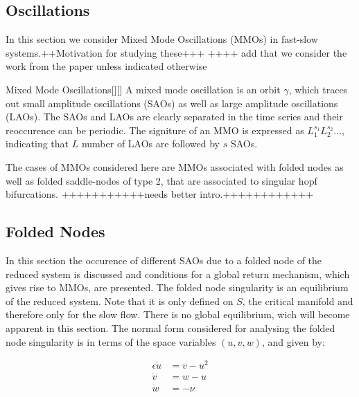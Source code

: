 \subsection{Oscillations}\label{sec: MMO Oscilaltions} %
In this section we consider Mixed Mode Oscillations (MMOs) in fast-slow systems.++Motivation for studying these+++
++++ add that we consider the work from the \citet{MMO} paper unless indicated otherwise

\begin{definition}{Mixed Mode Oscillations}[\citealp{kuehn}][\citealp{MMO}]
	A mixed mode oscillation is an orbit $\gamma$, which traces out small amplitude oscillations (SAOs) as well as large amplitude oscillations (LAOs).
	The SAOs and LAOs are clearly separated in the time series and their reoccurence can be periodic.
	The signiture of an MMO is expressed as $L_1^{s_1}L_2^{s_2}...$, indicating that $L$ number of LAOs are followed by $s$ SAOs.
\end{definition}

The cases of MMOs considered here are MMOs associated with folded nodes as well as folded saddle-nodes of type 2, that are associated to singular hopf bifurcations.
+++++++++++needs better intro.++++++++++++

\subsection{ Folded Nodes}
In this section the occurence of different SAOs due to a folded node of the reduced system is discussed and conditions for a global return mechanism, which gives rise to MMOs, are presented.
The folded node singularity is an equilibrium of the reduced system. Note that it is only defined on $S$, the critical manifold and therefore only for the slow flow. There is no global equilibrium, wich will become apparent in this section.
The normal form considered for analysing the folded node singularity is in terms of the space variables $(u,v,w)$, and given by:

\begin{align*}
\epsilon \dot{u} &= v - u^2\\
\dot{v} &= w-u\\
\dot{w} &= - \nu
\end{align*}

